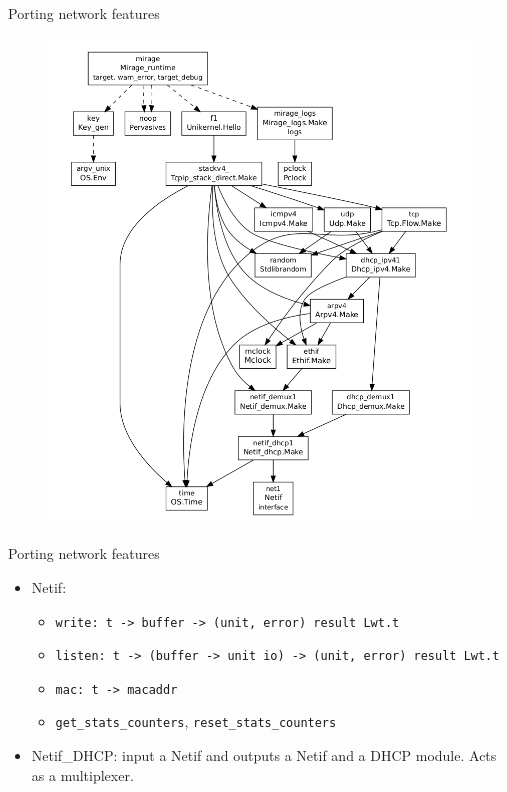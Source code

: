 \documentclass[10pt]{beamer}
\begin{document}
\begin{frame}{Porting network features}
\begin{figure}
\includegraphics[height=0.95\textheight]{unik.png}
\end{figure}
\end{frame}
\begin{frame}{Porting network features}
\begin{itemize}
    \item Netif: 
    \begin{itemize}
        \item \texttt{write: t -> buffer -> (unit, error) result Lwt.t}
        \item \texttt{listen: t -> (buffer -> unit io) -> (unit, error) result Lwt.t}
        \item \texttt{mac: t -> macaddr}
        \item \texttt{get\_stats\_counters}, \texttt{reset\_stats\_counters}
    \end{itemize}
    \item Netif\_DHCP: input a Netif and outputs a Netif and a DHCP module. Acts as a multiplexer.
\end{itemize}
\end{frame}
\end{document}
